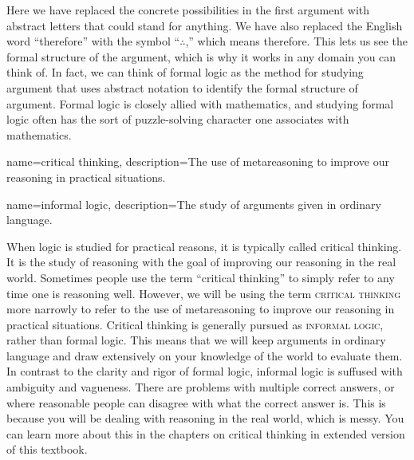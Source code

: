 Here we have replaced the concrete possibilities in the first argument with abstract letters that could stand for anything. We have also replaced the English word ``therefore'' with the symbol ``$\therefore$,'' which means therefore. This lets us see the formal structure of the argument, which is why it works in any domain you can think of. In fact, we can think of formal logic as the method for studying argument that uses abstract notation to identify the formal structure of argument.  Formal logic is closely allied with mathematics, and studying formal logic often has the sort of puzzle-solving character one associates with mathematics. 
	{
	{
{}	
	{}	}}
 
{
name=critical thinking,
description={The use of metareasoning to improve our reasoning in practical situations.}
}

{
name=informal logic,
description={The study of arguments given in ordinary language.}
}


When logic is studied for practical reasons, it is typically called critical thinking. It is the study of reasoning with the goal of improving our reasoning in the real world. Sometimes people use the term ``critical thinking'' to simply refer to any time one is reasoning well. However, we will be using the term \textsc{\gls{critical thinking}} more narrowly to refer to the use of metareasoning to improve our reasoning in practical situations.  \label{def:Critical_Thinking} Critical thinking is generally pursued as \textsc{\gls{informal logic}}, rather than formal logic. This means that we will keep arguments in ordinary language and draw extensively on your knowledge of the world to evaluate them. In contrast to the clarity and rigor of formal logic, informal logic is suffused with ambiguity and vagueness. There are problems  with multiple correct answers, or where reasonable people can disagree with what the correct answer is. This is because you will be dealing with reasoning in the real world, which is messy. \label{messiness_warning} 
\label{ver_var} You can learn more about this in the chapters on critical thinking in extended version of this textbook.  


